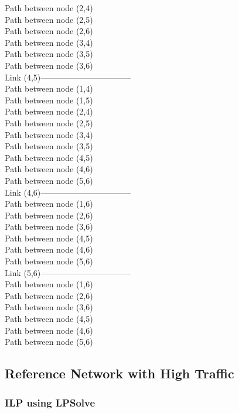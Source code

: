 Path between node (2,4)\\
Path between node (2,5)\\
Path between node (2,6)\\
Path between node (3,4)\\
Path between node (3,5)\\
Path between node (3,6)\\
Link (4,5)---------------------------------\\
Path between node (1,4)\\
Path between node (1,5)\\
Path between node (2,4)\\
Path between node (2,5)\\
Path between node (3,4)\\
Path between node (3,5)\\
Path between node (4,5)\\
Path between node (4,6)\\
Path between node (5,6)\\
Link (4,6)---------------------------------\\
Path between node (1,6)\\
Path between node (2,6)\\
Path between node (3,6)\\
Path between node (4,5)\\
Path between node (4,6)\\
Path between node (5,6)\\
Link (5,6)--------------------------------- \\
Path between node (1,6)\\
Path between node (2,6)\\
Path between node (3,6)\\
Path between node (4,5)\\
Path between node (4,6)\\
Path between node (5,6)\\


\subsection{Reference Network with High Traffic}

\subsubsection{ILP using LPSolve}

